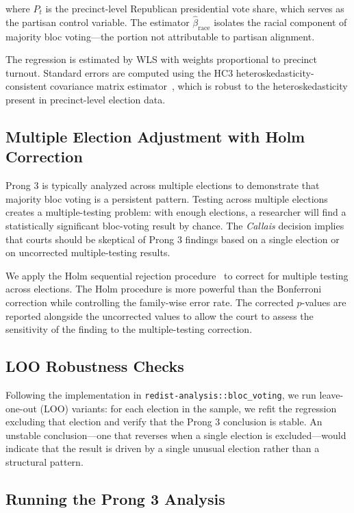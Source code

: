 where $P_t$ is the precinct-level Republican presidential vote share, which
serves as the partisan control variable.  The estimator $\hat{\beta}_{\text{race}}$
isolates the racial component of majority bloc voting---the portion not
attributable to partisan alignment.

The regression is estimated by WLS with weights proportional to precinct
turnout.  Standard errors are computed using the HC3 heteroskedasticity-consistent
covariance matrix estimator~\citep{mackinnon1985some}, which is robust to
the heteroskedasticity present in precinct-level election data.

\subsection{Multiple Election Adjustment with Holm Correction}

Prong 3 is typically analyzed across multiple elections to demonstrate that
majority bloc voting is a persistent pattern.  Testing across multiple
elections creates a multiple-testing problem: with enough elections, a
researcher will find a statistically significant bloc-voting result by chance.
The \textit{Callais} decision implies that courts should be skeptical of
Prong 3 findings based on a single election or on uncorrected multiple-testing
results.

We apply the Holm sequential rejection procedure~\citep{holm1979simple} to
correct for multiple testing across elections.  The Holm procedure is more
powerful than the Bonferroni correction while controlling the family-wise
error rate.  The corrected $p$-values are reported alongside the uncorrected
values to allow the court to assess the sensitivity of the finding to the
multiple-testing correction.

\subsection{LOO Robustness Checks}

Following the implementation in \texttt{redist-analysis::bloc\_voting}, we
run leave-one-out (LOO) variants: for each election in the sample, we refit
the regression excluding that election and verify that the Prong 3 conclusion
is stable.  An unstable conclusion---one that reverses when a single election
is excluded---would indicate that the result is driven by a single unusual
election rather than a structural pattern.

\subsection{Running the Prong 3 Analysis}

